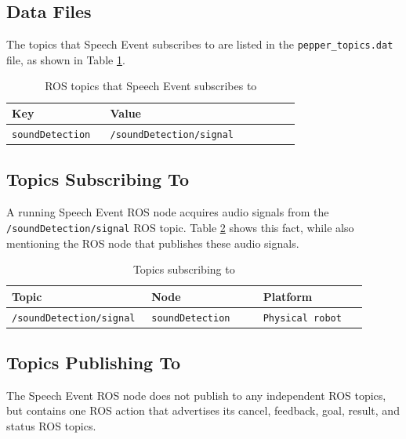 \documentclass{CSSRforAfrica}
\begin{document}
\newpage
\subsection{Data Files}

The topics that Speech Event subscribes to are listed in the \texttt{pepper\_topics.dat} file, as shown in Table \ref{table:speechEvent-topics-file}.

\begin{center}
\begin{table}[thb]
\begin{tabular}[thb]{|p{0.31\linewidth}|p{0.60\linewidth}|}\hline
\rowcolor{lightgray} Key & Value \\ \hline
\texttt{soundDetection} & \texttt{/soundDetection/signal} \\ \hline
\end{tabular}
\caption{ROS topics that Speech Event subscribes to}
\label{table:speechEvent-topics-file}
\end{table}
\end{center}

\subsection{Topics Subscribing To}

A running Speech Event ROS node acquires audio signals from the \texttt{/soundDetection/signal} ROS topic. Table \ref{table:topics-sub} shows this fact, while also mentioning the ROS node that publishes these audio signals.

\begin{center}
\begin{table}[thb]
\begin{tabular}[thb]{|p{0.32\linewidth}|p{0.30\linewidth}|p{0.28\linewidth}|} \hline
\rowcolor{lightgray} Topic & Node & Platform \\ \hline
\texttt{/soundDetection/signal} & \texttt{soundDetection} & \texttt{Physical robot} \\ \hline
\end{tabular}
\caption{Topics subscribing to}
\label{table:topics-sub}
\end{table}
\end{center}

\subsection{Topics Publishing To}

The Speech Event ROS node does not publish to any independent ROS topics, but contains one ROS action that advertises its cancel, feedback, goal, result, and status ROS topics.
\end{document}
